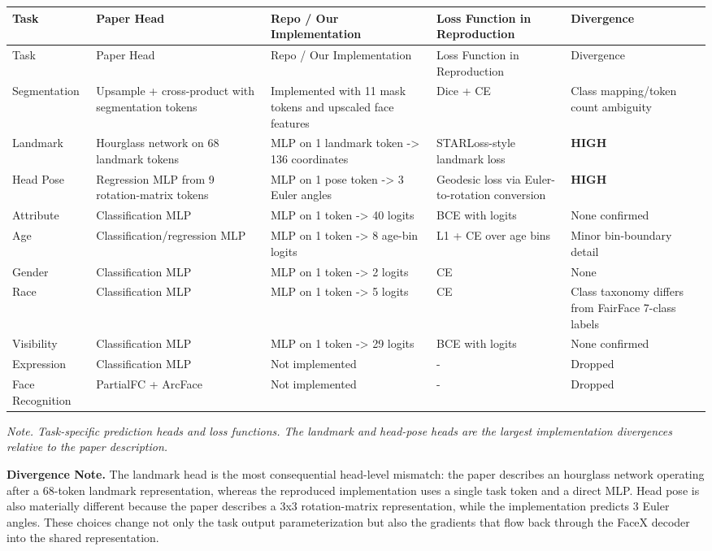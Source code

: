 \documentclass[11pt]{article}
\begin{document}
\begingroup
\scriptsize
\setlength{\tabcolsep}{3pt}
\begin{longtable}{@{}>{\RaggedRight\arraybackslash}p{}>{\RaggedRight\arraybackslash}p{}>{\RaggedRight\arraybackslash}p{}>{\RaggedRight\arraybackslash}p{}>{\RaggedRight\arraybackslash}p{}@{}}
\toprule
Task & Paper Head & Repo / Our Implementation & Loss Function in Reproduction & Divergence \\
\midrule
\endfirsthead
\toprule
Task & Paper Head & Repo / Our Implementation & Loss Function in Reproduction & Divergence \\
\midrule
\endhead
Segmentation & Upsample + cross-product with segmentation tokens & Implemented with 11 mask tokens and upscaled face features & Dice + CE & Class mapping/token count ambiguity \\
Landmark & Hourglass network on 68 landmark tokens & MLP on 1 landmark token -> 136 coordinates & STARLoss-style landmark loss & \textbf{HIGH} \\
Head Pose & Regression MLP from 9 rotation-matrix tokens & MLP on 1 pose token -> 3 Euler angles & Geodesic loss via Euler-to-rotation conversion & \textbf{HIGH} \\
Attribute & Classification MLP & MLP on 1 token -> 40 logits & BCE with logits & None confirmed \\
Age & Classification/regression MLP & MLP on 1 token -> 8 age-bin logits & L1 + CE over age bins & Minor bin-boundary detail \\
Gender & Classification MLP & MLP on 1 token -> 2 logits & CE & None \\
Race & Classification MLP & MLP on 1 token -> 5 logits & CE & Class taxonomy differs from FairFace 7-class labels \\
Visibility & Classification MLP & MLP on 1 token -> 29 logits & BCE with logits & None confirmed \\
Expression & Classification MLP & Not implemented & - & Dropped \\
Face Recognition & PartialFC + ArcFace & Not implemented & - & Dropped \\
\bottomrule
\end{longtable}
\endgroup


\emph{Note. Task-specific prediction heads and loss functions. The landmark and head-pose heads are the largest implementation divergences relative to the paper description.}

\textbf{Divergence Note.} The landmark head is the most consequential head-level mismatch: the paper describes an hourglass network operating after a 68-token landmark representation, whereas the reproduced implementation uses a single task token and a direct MLP. Head pose is also materially different because the paper describes a 3x3 rotation-matrix representation, while the implementation predicts 3 Euler angles. These choices change not only the task output parameterization but also the gradients that flow back through the FaceX decoder into the shared representation.
\end{document}
